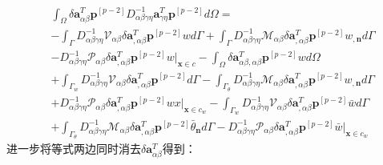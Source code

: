 \begin{equation}
\begin{split}
    &\int_{\Omega}\delta\pmb{a}_{\alpha\beta}^T\pmb{p}^{[p-2]}D^{-1}_{\alpha\beta\gamma\eta}\pmb{a}_{\gamma\eta}^T\pmb{p}^{[p-2]}d\Omega=\\
    &-\int_{\Gamma}D_{\alpha\beta\gamma\eta}^{-1}\mathcal{V}_{\alpha\beta}\delta\pmb{a}_{,\alpha\beta}^T\pmb{p}^{[p-2]}wd\Gamma
    +\int_{\Gamma}D_{\alpha\beta\gamma\eta}^{-1}\mathcal{M}_{\alpha\beta}\delta\pmb{a}_{,\alpha\beta}^T\pmb{p}^{[p-2]}w_{,\pmb{n}}d\Gamma\\
    &-D_{\alpha\beta\gamma\eta}^{-1}\mathcal{P}_{\alpha\beta}\delta\pmb{a}_{,\alpha\beta}^T\pmb{p}^{[p-2]}w\vert_{\pmb x\in c}
    -\int_{\Omega}\delta\pmb{a}_{\alpha\beta,\alpha\beta}^T\pmb{p}^{[p-2]}wd\Omega\\
    &+\int_{\Gamma_w}D_{\alpha\beta\gamma\eta}^{-1}\mathcal{V}_{\alpha\beta}\delta\pmb{a}_{,\alpha\beta}^T\pmb{p}^{[p-2]}d\Gamma
    -\int_{\Gamma_{\theta}}D_{\alpha\beta\gamma\eta}^{-1}\mathcal{M}_{\alpha\beta}\delta\pmb{a}_{,\alpha\beta}^T\pmb{p}^{[p-2]}w_{,\pmb{n}}d\Gamma\\
    &+D_{\alpha\beta\gamma\eta}^{-1}\mathcal{P}_{\alpha\beta}\delta\pmb{a}_{,\alpha\beta}^T\pmb{p}^{[p-2]}wx\vert_{\pmb x\in{c_w}}
    -\int_{\Gamma_w}D_{\alpha\beta\gamma\eta}^{-1}\mathcal{V}_{\alpha\beta}\delta\pmb{a}_{,\alpha\beta}^T\pmb{p}^{[p-2]}\bar{w}d\Gamma\\
    &+\int_{\Gamma_{\theta}}D_{\alpha\beta\gamma\eta}^{-1}\mathcal{M}_{\alpha\beta}\delta\pmb{a}_{,\alpha\beta}^T\pmb{p}^{[p-2]}\bar{\theta}_{\pmb{n}}d\Gamma
    -D_{\alpha\beta\gamma\eta}^{-1}\mathcal{P}_{\alpha\beta}\delta\pmb{a}_{,\alpha\beta}^T\pmb{p}^{[p-2]}\bar{w}\vert_{\pmb x\in{c_w}}
\end{split}
\end{equation}
进一步将等式两边同时消去$\delta\pmb{a}^T_{\alpha\beta}$得到：
